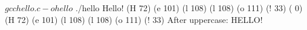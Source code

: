 \documentclass[12pt, oneside, landscape]{article}
\begin{document}
  
\begin{shell}[linewidth=30em,basicstyle=\ttfamily\scriptsize]
$ gcc hello.c -o hello
$ ./hello             
Hello!
(H 72) (e 101) (l 108) (l 108) (o 111) (! 33) ( 0)
(H 72) (e 101) (l 108) (l 108) (o 111) (! 33) 
After uppercase: HELLO!
\end{shell}
\end{document}
